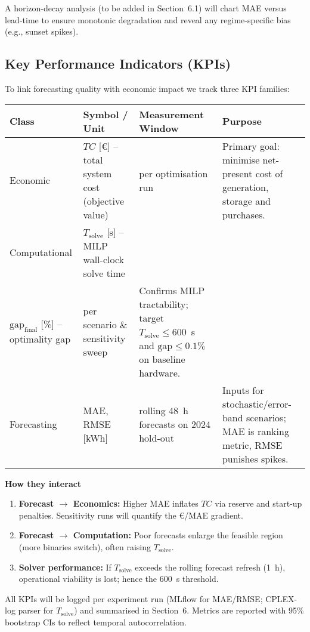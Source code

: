 A horizon-decay analysis (to be added in Section~6.1) will chart MAE versus lead-time to ensure monotonic degradation and reveal any regime-specific bias (e.g., sunset spikes).

\subsection{Key Performance Indicators (KPIs)}
\label{sec:kpis}

To link forecasting quality with economic impact we track three KPI families:

\begin{center}
\begin{tabular}{llll}
Class & Symbol / Unit & Measurement Window & Purpose \\
\hline
Economic & $TC$ [€] -- total system cost (objective value) & per optimisation run & Primary goal: minimise net-present cost of generation, storage and purchases. \\
Computational & $T_{\text{solve}}$ [s] -- MILP wall-clock solve time \\ $\text{gap}_{\text{final}}$ [\%] -- optimality gap & per scenario \& sensitivity sweep & Confirms MILP tractability; target $T_{\text{solve}} \leq 600$~s and $\text{gap} \leq 0.1\%$ on baseline hardware. \\
Forecasting & MAE, RMSE [kWh] & rolling 48~h forecasts on 2024 hold-out & Inputs for stochastic/error-band scenarios; MAE is ranking metric, RMSE punishes spikes. \\
\end{tabular}
\end{center}

\textbf{How they interact}
\begin{enumerate}
    \item \textbf{Forecast $\rightarrow$ Economics:} Higher MAE inflates $TC$ via reserve and start-up penalties. Sensitivity runs will quantify the €/MAE gradient.
    \item \textbf{Forecast $\rightarrow$ Computation:} Poor forecasts enlarge the feasible region (more binaries switch), often raising $T_{\text{solve}}$.
    \item \textbf{Solver performance:} If $T_{\text{solve}}$ exceeds the rolling forecast refresh (1~h), operational viability is lost; hence the 600~s threshold.
\end{enumerate}

All KPIs will be logged per experiment run (MLflow for MAE/RMSE; CPLEX-log parser for $T_{\text{solve}}$) and summarised in Section~6. Metrics are reported with 95\% bootstrap CIs to reflect temporal autocorrelation.

\newpage
